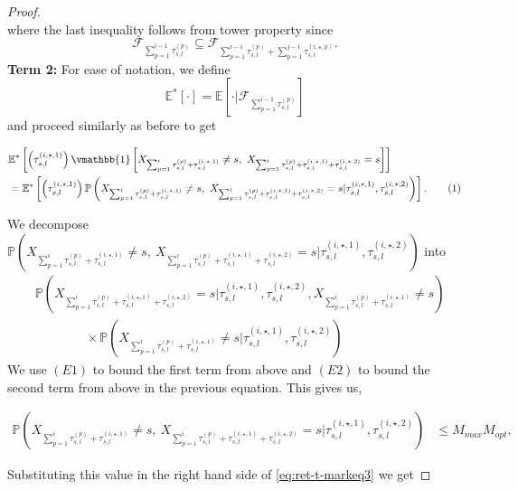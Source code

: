 \documentclass[opre,sglanonrev]{informs4}
\numberwithin{equation}{section}
\newcommand{\pow}[1]{^{(#1)}}
\newcommand{\lp}{\left(}
\newcommand{\rp}{\right)}
\newcommand{\lb}{\left[}
\newcommand{\rb}{\right]}
\newcommand{\Pbb}{\mathbb{P}}
\newcommand{\Fcal}{\mathcal{F}}
\newcommand\numberthis{\addtocounter{equation}{1}\tag{\theequation}}
\newcommand{\prob}{\Pbb}
\newcommand{\expec}{\mathbb{E}}
\newcommand{\indicator}{\vmathbb{1}}
\begin{document}
\begin{APPENDICES}
\begin{proof}
\[\]
where the last inequality follows from tower property since \[\Fcal_{\sum_{p=1}^{i-1} \tau_{s,l}\pow{p}}\subseteq \Fcal_{\sum_{p=1}^{i-1} \tau_{s,l}\pow{p}+\sum_{p=1}^{j-1}\tau_{s,l}\pow{i,\star,p}}.\]
\textbf{Term 2: }For ease of notation, we define 
\[
\expec^*[\cdot]=\expec[\cdot|\Fcal_{\sum_{p=1}^{i-1} \tau_{s,l}\pow{p}}]
\]
and proceed similarly as before to get
\begin{small}
\begin{align*}
    &\expec^*\lb\lp\tau_{s,l}\pow{i,\star,1}\rp\indicator\lb X_{\sum_{p=1}^i \tau_{s,l}\pow{p}+ \tau_{s,l}\pow{i,\star,1}}\neq s,\ X_{\sum_{p=1}^i \tau_{s,l}\pow{p}+ \tau_{s,l}\pow{i,\star,1}+ \tau_{s,l}\pow{i,\star,2}}=s\rb\rb\\ 
    & = \expec^*\lb\lp\tau_{s,l}\pow{i,\star,1}\rp\prob\lp X_{\sum_{p=1}^i \tau_{s,l}\pow{p}+ \tau_{s,l}\pow{i,\star,1}}\neq s,\ X_{\sum_{p=1}^i \tau_{s,l}\pow{p}+ \tau_{s,l}\pow{i,\star,1}+ \tau_{s,l}\pow{i,\star,2}}=s|\tau_{s,l}\pow{i,\star,1},\tau_{s,l}\pow{i,\star,2}\rp\rb.\numberthis\label{eq:ret-t-markeq3}
\end{align*}
\end{small}
We decompose $\prob\lp X_{\sum_{p=1}^i \tau_{s,l}\pow{p}+ \tau_{s,l}\pow{i,\star,1}}\neq s,\ X_{\sum_{p=1}^i \tau_{s,l}\pow{p}+ \tau_{s,l}\pow{i,\star,1}+ \tau_{s,l}\pow{i,\star,2}}=s|\tau_{s,l}\pow{i,\star,1},\tau_{s,l}\pow{i,\star,2}\rp$ into 
\begin{align*}
& \prob\lp X_{\sum_{p=1}^i \tau_{s,l}\pow{p}+ \tau_{s,l}\pow{i,\star,1}+ \tau_{s,l}\pow{i,\star,2}}=s|\tau_{s,l}\pow{i,\star,1},\tau_{s,l}\pow{i,\star,2}, X_{\sum_{p=1}^i \tau_{s,l}\pow{p}+ \tau_{s,l}\pow{i,\star,1}}\neq s\rp\\
 & \qquad \qquad \times \prob\lp X_{\sum_{p=1}^i \tau_{s,l}\pow{p}+ \tau_{s,l}\pow{i,\star,1}}\neq s|\tau_{s,l}\pow{i,\star,1},\tau_{s,l}\pow{i,\star,2}\rp
\end{align*}
We use $(E1)$ to bound the first term from above and $(E2)$ to bound the second term from above in the previous equation. 
This gives us,
\begin{small}
\begin{align*}
    \prob\lp X_{\sum_{p=1}^i \tau_{s,l}\pow{p}+ \tau_{s,l}\pow{i,\star,1}}\neq s,\ X_{\sum_{p=1}^i \tau_{s,l}\pow{p}+ \tau_{s,l}\pow{i,\star,1}+ \tau_{s,l}\pow{i,\star,2}}=s|\tau_{s,l}\pow{i,\star,1},\tau_{s,l}\pow{i,\star,2}\rp & \leq   M_{max}M_{opt},
\end{align*}
\end{small}
Substituting this value in the right hand side of \cref{eq:ret-t-markeq3} we get

\end{proof}
\end{APPENDICES}
\end{document}
